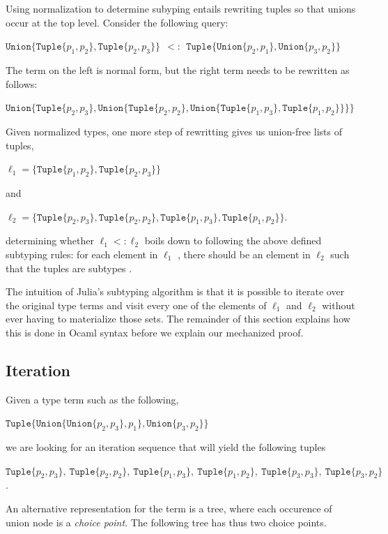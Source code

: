 \documentclass[a4paper,english]{lipics-v2019}
\newcommand{\xt}[1]{\texttt{#1}}
\newcommand{\union}[2]{\xt{Union\{}#1,#2\xt{\}}}
\newcommand{\tuple}[1]{\xt{Tuple\{}#1\xt{\}}}
\begin{document}
\noindent
Using normalization to determine subyping entails rewriting tuples so that
unions occur at the top level. Consider the following query:

\medskip
$\union{ \tuple{p_1,p_2}}{\tuple{p_2,p_3}} ~~ <:~~  \tuple{ \union{p_2}{p_1}, \union{p_3}{p_2}}$
\medskip

\noindent
The term on the left is normal form, but the right term  needs to be
rewritten as follows:

\medskip
$\union{ \tuple{p_2,p_3}}
  {\union{ \tuple{p_2,p_2}}
    {\union{ \tuple{p_1,p_3}}
           {\tuple{p_1,p_2}}}}$
\medskip

\noindent
Given normalized types, one more step of rewritting gives us union-free
lists of tuples,

\medskip
$\ell_1 = \{  \tuple{p_1,p_2}, \tuple{p_2,p_3}  \}$
\medskip

\noindent and

\medskip
$\ell_2 = \{  \tuple{p_2,p_3}, \tuple{p_2,p_2}, \tuple{p_1,p_3}, 
          \tuple{p_1,p_2} \}$.
\medskip

\noindent determining whether $\ell_1 <: \ell_2$ boils down to following the
above defined subtyping rules: for each element in $\ell_1$ {\sc
  [allexist]}, there should be an element in $\ell_2$ {\sc [existL/R]} such
that the tuples are subtypes {\sc [tuple]}.

The intuition of Julia's subtyping algorithm is that it is possible to
iterate over the original type terms and visit every one of the elements of
$\ell_1$ and $\ell_2$ without ever having to materialize those sets. The
remainder of this section explains how this is done in Ocaml syntax before
we explain our mechanized proof.

\subsection{Iteration}

Given a type term such as the following,

\medskip
$\tuple{ \union{ \union{p_2}{p_3} }{p_1}, \union{p_3}{p_2}}$
\medskip

\noindent
we are looking for an iteration sequence that will yield the following tuples

\medskip
\noindent $\tuple{p_2,p_3}, ~ \tuple{p_2,p_2}, ~ \tuple{p_1,p_3}, ~ \tuple{p_1,p_2}, ~
  \tuple{p_3,p_3}, ~ \tuple{p_3,p_2}$.

\noindent
An alternative representation for the term is a tree, where each occurence
of union node is a \emph{choice point}. The following tree has thus two
choice points.
\end{document}
